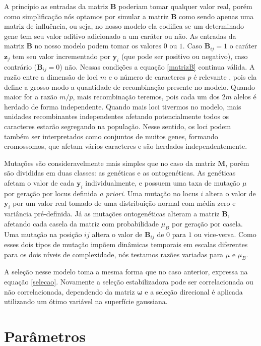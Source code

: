 A princípio as entradas da matriz $\mathbf{B}$ poderiam tomar qualquer
valor real, porém como simplificação nós optamos por simular a matriz
$\mathbf{B}$ como sendo apenas uma matriz de influência, ou seja, no
nosso modelo ela codifica se um determinado gene tem seu valor aditivo
adicionado a um caráter ou não.
As entradas da matriz $\mathbf{B}$ no nosso modelo podem tomar os valores $0$ ou
$1$.
Caso $\mathbf{B}_{ij} = 1$ o caráter $\mathbf{z}_j$ tem seu valor
incrementado por $\mathbf{y}_i$
(que pode ser positivo ou negativo), caso contrário ($\mathbf{B}_{ij} = 0$) não.
Nessas condições a equação \ref{matrizB} continua válida.
A razão entre a dimensão de loci $m$ e o número de
caracteres $p$ é relevante \citep{Wagner1984}, pois ela define a grosso modo
a quantidade de recombinação presente no modelo.
Quando maior for a razão $m/p$, mais recombinação teremos, pois cada
um dos $2m$ alelos é herdado de forma independente.
Quando mais loci tivermos no modelo, mais unidades recombinantes
independentes afetando potencialmente todos os caracteres estarão segregando
na população.
Nesse sentido, os loci podem também ser interpretados como conjuntos de
muitos genes, formando cromossomos, que afetam vários caracteres e são
herdados independentemente.

Mutações são consideravelmente mais simples que no caso da
matriz $\mathbf{M}$, porém são divididas em duas classes: as genéticas e as
ontogenéticas.
As genéticas afetam o valor de cada $\mathbf{y}_i$ individualmente, e possuem uma
taxa de mutação $\mu$ por geração por locus definida {\it a priori}.
Uma mutação no locus $i$ altera o valor de $\mathbf{y}_i$ por um valor real tomado
de uma distribuição normal com média zero e variância pré-definida.
Já as mutações ontogenéticas alteram a matriz $\mathbf{B}$, afetando cada casela
da matriz com probabilidade $\mu_B$ por geração por casela.
Uma mutação na posição $ij$ altera o valor de $\mathbf{B}_{ij}$ de $0$ para $1$
ou vice-versa.
Como esses dois tipos de mutação impõem dinâmicas temporais em escalas
diferentes para os dois níveis de complexidade, nós testamos razões
variadas para $\mu$ e $\mu_B$.


A seleção nesse modelo toma a mesma forma que no caso anterior, expressa
na equação \ref{selecao}.
Novamente a seleção estabilizadora pode ser correlacionada ou não
correlacionada, dependendo da matriz $\pmb{\omega}$ e a seleção direcional é
aplicada utilizando um ótimo variável na superfície gaussiana.

\section{Parâmetros}\label{cap2:parametros}

